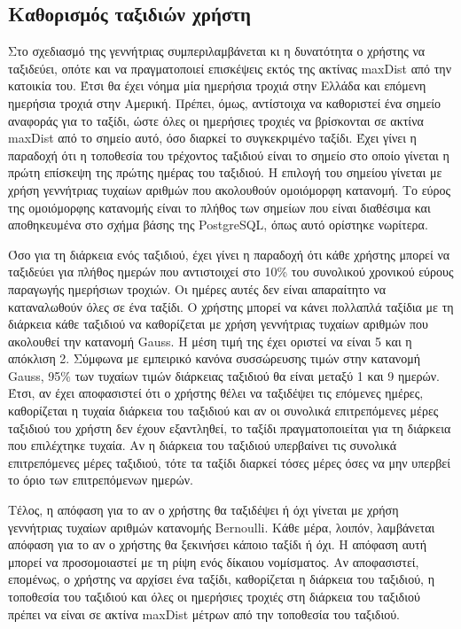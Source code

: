 \subsection{Καθορισμός ταξιδιών χρήστη}

Στο σχεδιασμό της γεννήτριας συμπεριλαμβάνεται κι η δυνατότητα ο χρήστης να ταξιδεύει, οπότε και να πραγματοποιεί επισκέψεις εκτός της ακτίνας maxDist από 
την κατοικία του. Έτσι θα έχει νόημα μία ημερήσια τροχιά στην Ελλάδα και επόμενη ημερήσια τροχιά στην Αμερική. Πρέπει, όμως, αντίστοιχα να καθοριστεί ένα σημείο αναφοράς 
για το ταξίδι, ώστε όλες οι ημερήσιες τροχιές να βρίσκονται σε ακτίνα maxDist από το σημείο αυτό, όσο διαρκεί το συγκεκριμένο ταξίδι. 
Έχει γίνει η παραδοχή ότι η τοποθεσία του τρέχοντος ταξιδιού είναι το σημείο στο οποίο γίνεται η πρώτη επίσκεψη της πρώτης ημέρας του ταξιδιού. 
Η επιλογή του σημείου γίνεται με χρήση γεννήτριας τυχαίων αριθμών που ακολουθούν ομοιόμορφη κατανομή. Το εύρος της ομοιόμορφης κατανομής είναι το πλήθος των 
σημείων που είναι διαθέσιμα και αποθηκευμένα στο σχήμα βάσης της PostgreSQL, όπως αυτό ορίστηκε νωρίτερα. 

Όσο για τη διάρκεια ενός ταξιδιού, έχει γίνει η παραδοχή ότι κάθε χρήστης μπορεί να ταξιδεύει για πλήθος ημερών που αντιστοιχεί στο 10\% του 
συνολικού χρονικού εύρους παραγωγής \linebreak ημερήσιων τροχιών. Οι ημέρες αυτές δεν είναι απαραίτητο να καταναλωθούν όλες σε ένα ταξίδι. 
Ο χρήστης μπορεί να κάνει πολλαπλά ταξίδια με τη 
διάρκεια κάθε ταξιδιού να καθορίζεται με χρήση γεννήτριας τυχαίων αριθμών που ακολουθεί την κατανομή Gauss. Η μέση τιμή της έχει οριστεί να είναι 5 και η απόκλιση 2. 
Σύμφωνα με εμπειρικό κανόνα συσσώρευσης τιμών στην κατανομή Gauss, 95\% των τυχαίων τιμών διάρκειας ταξιδιού θα είναι μεταξύ 1 και 9 ημερών. Έτσι, αν έχει αποφασιστεί 
ότι ο χρήστης θέλει να ταξιδέψει τις επόμενες ημέρες, καθορίζεται η τυχαία διάρκεια του ταξιδιού και αν οι συνολικά επιτρεπόμενες μέρες ταξιδιού του χρήστη δεν έχουν 
εξαντληθεί, το ταξίδι πραγματοποιείται για τη διάρκεια που επιλέχτηκε τυχαία. Αν η διάρκεια του ταξιδιού υπερβαίνει τις συνολικά επιτρεπόμενες μέρες ταξιδιού, 
τότε τα ταξίδι διαρκεί τόσες μέρες όσες να μην υπερβεί το όριο των επιτρεπόμενων ημερών. 

Τέλος, η απόφαση για το αν ο χρήστης θα ταξιδέψει ή όχι γίνεται με 
χρήση γεννήτριας τυχαίων αριθμών κατανομής Bernoulli. Κάθε μέρα, λοιπόν, λαμβάνεται απόφαση για το αν ο χρήστης θα ξεκινήσει κάποιο ταξίδι ή όχι. Η απόφαση αυτή 
μπορεί να προσομοιαστεί με τη ρίψη ενός δίκαιου νομίσματος. Αν αποφασιστεί, επομένως, ο χρήστης να αρχίσει ένα ταξίδι, καθορίζεται η διάρκεια του ταξιδιού, η 
τοποθεσία του ταξιδιού και όλες οι ημερήσιες τροχιές στη διάρκεια του ταξιδιού πρέπει να είναι σε ακτίνα maxDist μέτρων από την τοποθεσία του ταξιδιού. 


